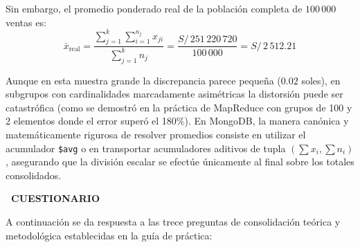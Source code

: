 \documentclass[12pt,a4paper]{article}
\newcommand{\llav}{\symbol{60}\symbol{60}}
\newcommand{\rlav}{\symbol{62}\symbol{62}}
\newcommand{\marcador}[1]{\llav\ #1\ \rlav}
\newcommand{\seccion}[1]{%
  \vspace{0.6cm}%
  {\centering\bfseries\fontsize{12pt}{14pt}\selectfont\marcador{\MakeUppercase{#1}}\par}%
  \vspace{0.35cm}%
}
\begin{document}
Sin embargo, el promedio ponderado real de la población completa de $100\,000$ ventas es:
\begin{equation}
    \bar{x}_{\text{real}} = \frac{\sum_{j=1}^{k} \sum_{i=1}^{n_j} x_{ji}}{\sum_{j=1}^{k} n_j} = \frac{S/\,251\,220\,720}{100\,000} = S/\,2\,512.21
\end{equation}

Aunque en esta muestra grande la discrepancia parece pequeña ($0.02$ soles), en subgrupos con cardinalidades marcadamente asimétricas la distorsión puede ser catastrófica (como se demostró en la práctica de MapReduce con grupos de 100 y 2 elementos donde el error superó el 180\%). En MongoDB, la manera canónica y matemáticamente rigurosa de resolver promedios consiste en utilizar el acumulador \texttt{\$avg} o en transportar acumuladores aditivos de tupla $(\sum x_i, \sum n_i)$, asegurando que la división escalar se efectúe únicamente al final sobre los totales consolidados.

\clearpage

\seccion{CUESTIONARIO}

A continuación se da respuesta a las trece preguntas de consolidación teórica y metodológica establecidas en la guía de práctica:
\end{document}
